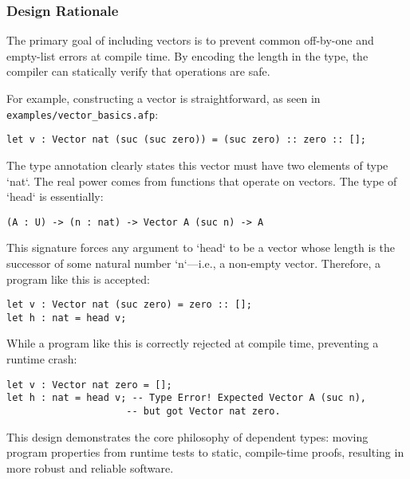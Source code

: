 \subsubsection{Design Rationale}

The primary goal of including vectors is to prevent common off-by-one and empty-list errors at compile time. By encoding the length in the type, the compiler can statically verify that operations are safe.

For example, constructing a vector is straightforward, as seen in \texttt{examples/vector\_basics.afp}:
\begin{verbatim}
let v : Vector nat (suc (suc zero)) = (suc zero) :: zero :: [];
\end{verbatim}
The type annotation clearly states this vector must have two elements of type `nat`. The real power comes from functions that operate on vectors. The type of `head` is essentially:
\begin{verbatim}
(A : U) -> (n : nat) -> Vector A (suc n) -> A
\end{verbatim}
This signature forces any argument to `head` to be a vector whose length is the successor of some natural number `n`—i.e., a non-empty vector. Therefore, a program like this is accepted:
\begin{verbatim}
let v : Vector nat (suc zero) = zero :: [];
let h : nat = head v;
\end{verbatim}
While a program like this is correctly rejected at compile time, preventing a runtime crash:
\begin{verbatim}
let v : Vector nat zero = [];
let h : nat = head v; -- Type Error! Expected Vector A (suc n),
                     -- but got Vector nat zero.
\end{verbatim}
This design demonstrates the core philosophy of dependent types: moving program properties from runtime tests to static, compile-time proofs, resulting in more robust and reliable software.
